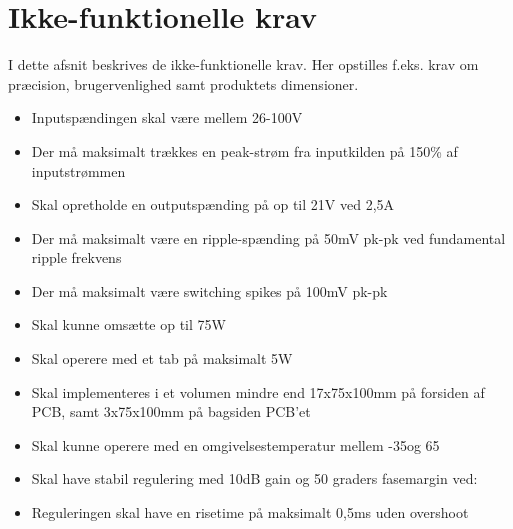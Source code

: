\section{Ikke-funktionelle krav}
I dette afsnit beskrives de ikke-funktionelle krav. Her opstilles f.eks. krav om præcision, brugervenlighed samt produktets dimensioner.
\begin{itemize}
			\item Inputspændingen skal være mellem 26-100V
			\item Der må maksimalt trækkes en peak-strøm fra inputkilden på 150\% af inputstrømmen
			\item Skal opretholde en outputspænding på op til 21V ved 2,5A
			\item Der må maksimalt være en ripple-spænding på 50mV pk-pk ved fundamental ripple frekvens
			\item Der må maksimalt være switching spikes på 100mV pk-pk
			\item Skal kunne omsætte op til 75W
			\item Skal operere med et tab på maksimalt 5W %
			\item Skal implementeres i et volumen mindre end 17x75x100mm på forsiden af PCB, samt 3x75x100mm på bagsiden PCB'et
			\item Skal kunne operere med en omgivelsestemperatur mellem -35\degreeCelsius  og 65\degreeCelsius
			\item Skal have stabil regulering med 10dB gain og 50 graders fasemargin ved:
			\item Reguleringen skal have en risetime på maksimalt 0,5ms uden overshoot
					
\end{itemize}
